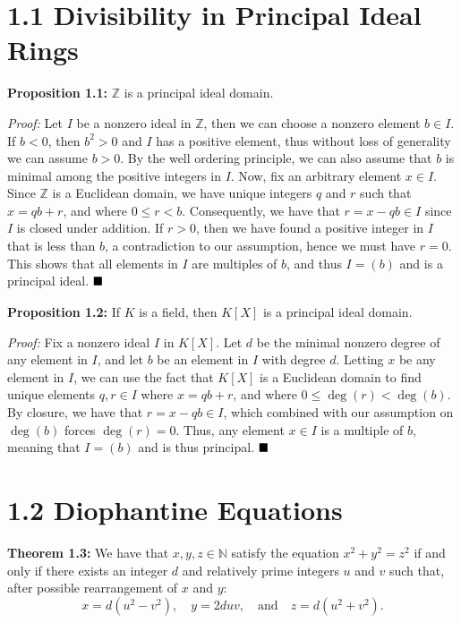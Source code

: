 \documentclass[12pt]{article}
\newcommand{\N}{\ensuremath{\mathbb{N}}}
\newcommand{\Z}{\ensuremath{\mathbb{Z}}}
\newcommand{\proof}{\textit{Proof: }}
\newcommand{\done}{\ensuremath{\strut\hfill\blacksquare}}
\begin{document}
\section*{1.1 Divisibility in Principal Ideal Rings}

\textbf{Proposition 1.1:}
\( \Z \) is a principal ideal domain.

\proof
Let \( I \) be a nonzero ideal in \( \Z \), then we can choose a nonzero
element \( b \in I \).
If \( b < 0 \), then \( b^2 > 0 \) and \( I \) has a positive element, thus
without loss of generality we can assume \( b > 0 \).
By the well ordering principle, we can also assume that \( b \) is minimal
among the positive integers in \( I \).
Now, fix an arbitrary element \( x \in I \).
Since \( \Z \) is a Euclidean domain, we have unique integers \( q \) and
\( r \) such that \( x = qb + r \), and where \( 0 \leq r < b \).
Consequently, we have that \( r = x - qb \in I \) since \( I \) is closed under
addition.
If \( r > 0 \), then we have found a positive integer in \( I \) that is
less than \( b \), a contradiction to our assumption, hence we must have
\( r = 0 \).
This shows that all elements in \( I \) are multiples of \( b \), and thus
\( I = (b) \) and is a principal ideal.
\done

\textbf{Proposition 1.2:}
If \( K \) is a field, then \( K[X] \) is a principal ideal domain.

\proof
Fix a nonzero ideal \( I \) in \( K[X] \).
Let \( d \) be the minimal nonzero degree of any element in \( I \), and let
\( b \) be an element in \( I \) with degree \( d \).
Letting \( x \) be any element in \( I \), we can use the fact that \( K[X] \)
is a Euclidean domain to find unique elements \( q, r \in I \) where
\( x = qb + r \), and where \( 0 \leq \deg(r) < \deg(b) \).
By closure, we have that \( r = x - qb \in I \), which combined with our
assumption on \( \deg(b) \) forces \( \deg(r) = 0 \).
Thus, any element \( x \in I \) is a multiple of \( b \), meaning that
\( I = (b) \) and is thus principal.
\done

\section*{1.2 Diophantine Equations}

\textbf{Theorem 1.3:}
We have that \( x, y, z \in \N \) satisfy the equation \( x^2 + y^2 = z^2 \)
if and only if there exists an integer \( d \) and relatively prime integers
\( u \) and \( v \) such that, after possible rearrangement of \( x \) and
\( y \):
\[
	x = d(u^2 - v^2), \quad
	y = 2duv, \quad\text{and}\quad
	z = d(u^2 + v^2).
\]
\end{document}
